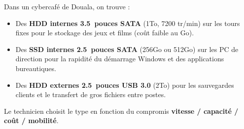\documentclass[11pt]{article}
\begin{document}
\begin{exemplebox}
Dans un cybercafé de Douala, on trouve :
\begin{itemize}
\item Des \textbf{HDD internes \SI{3,5}{pouces} SATA} (\num{1}{To}, \num{7200} tr/min) sur les tours fixes pour le stockage des jeux et films (coût faible au Go).
\item Des \textbf{SSD internes \SI{2,5}{pouces} SATA} (\num{256}{Go} ou \num{512}{Go}) sur les PC de direction pour la rapidité du démarrage Windows et des applications bureautiques.
\item Des \textbf{HDD externes \SI{2,5}{pouces} USB 3.0} (\num{2}{To}) pour les sauvegardes clients et le transfert de gros fichiers entre postes.
\end{itemize}
Le technicien choisit le type en fonction du compromis \textbf{vitesse / capacité / coût / mobilité}.
\end{exemplebox}
\end{document}
